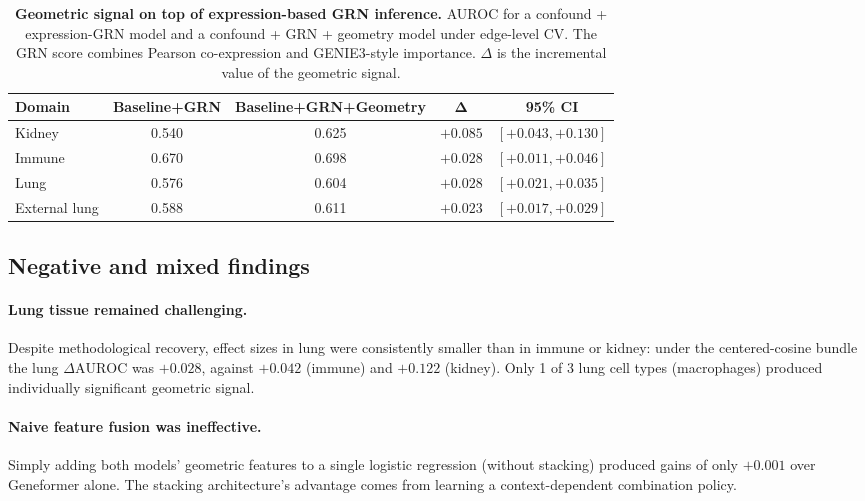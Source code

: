 \documentclass[11pt]{article}
\newcommand{\DAURC}{\Delta\mathrm{AUROC}}
\begin{document}
\begin{table}[t]
\centering
\caption{\textbf{Geometric signal on top of expression-based GRN inference.}
AUROC for a confound + expression-GRN model and a confound + GRN + geometry model under edge-level CV. The GRN score combines Pearson co-expression and GENIE3-style importance. $\Delta$ is the incremental value of the geometric signal.}
\label{tab:grn}
\small
\begin{tabular}{lcccc}
\toprule
\textbf{Domain} & \textbf{Baseline+GRN} & \textbf{Baseline+GRN+Geometry} & $\boldsymbol{\Delta}$ & \textbf{95\% CI} \\
\midrule
Kidney        & 0.540 & 0.625 & $+0.085$ & $[+0.043, +0.130]$ \\
Immune        & 0.670 & 0.698 & $+0.028$ & $[+0.011, +0.046]$ \\
Lung          & 0.576 & 0.604 & $+0.028$ & $[+0.021, +0.035]$ \\
External lung & 0.588 & 0.611 & $+0.023$ & $[+0.017, +0.029]$ \\
\bottomrule
\end{tabular}
\end{table}

\subsection*{Negative and mixed findings}

\paragraph{Lung tissue remained challenging.}
Despite methodological recovery, effect sizes in lung were consistently smaller than in immune or kidney: under the centered-cosine bundle the lung $\DAURC$ was $+0.028$, against $+0.042$ (immune) and $+0.122$ (kidney).
Only 1 of 3 lung cell types (macrophages) produced individually significant geometric signal.

\paragraph{Naive feature fusion was ineffective.}
Simply adding both models' geometric features to a single logistic regression (without stacking) produced gains of only $+0.001$ over Geneformer alone.
The stacking architecture's advantage comes from learning a context-dependent combination policy.


\end{document}
